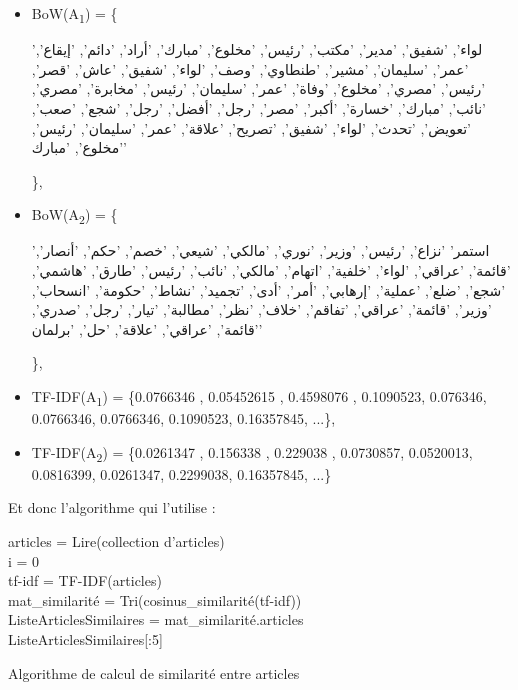     \begin{itemize}[label={}, leftmargin=0cm]
        \item BoW(A\textsubscript{1}) = \{\begin{arab}'لواء', 'شفيق', 'مدير', 'مكتب', 'رئيس', 'مخلوع', 'مبارك', 'أراد', 'دائم', 'إيقاع', 'عمر', 'سليمان', 'مشير', 'طنطاوي', 'وصف', 'لواء', 'شفيق', 'عاش', 'قصر', 'رئيس', 'مصري', 'مخلوع', 'وفاة', 'عمر', 'سليمان', 'رئيس', 'مخابرة', 'مصري', 'نائب', 'مبارك', 'خسارة', 'أكبر', 'مصر', 'رجل', 'أفضل', 'رجل', 'شجع', 'صعب', 'تعويض', 'تحدث', 'لواء', 'شفيق', 'تصريح', 'علاقة', 'عمر', 'سليمان', 'رئيس', 'مخلوع', 'مبارك'\end{arab}\},

        \item BoW(A\textsubscript{2}) = \{\begin{arab}'استمر' 'نزاع', 'رئيس', 'وزير', 'نوري', 'مالكي', 'شيعي', 'خصم', 'حكم', 'أنصار', 'قائمة', 'عراقي', 'لواء', 'خلفية', 'اتهام', 'مالكي', 'نائب', 'رئيس', 'طارق', 'هاشمي', 'شجع', 'ضلع', 'عملية', 'إرهابي', 'أمر', 'أدى', 'تجميد', 'نشاط', 'حكومة', 'انسحاب', 'وزير', 'قائمة', 'عراقي', 'تفاقم', 'خلاف', 'نظر', 'مطالبة', 'تيار', 'رجل', 'صدري', 'قائمة', 'عراقي', 'علاقة', 'حل', 'برلمان'\end{arab}\},

        \item TF-IDF(A\textsubscript{1}) = \{0.0766346 , 0.05452615 , 0.4598076 , 0.1090523,  0.076346, 0.0766346, 0.0766346, 0.1090523, 0.16357845, ...\},

        \item TF-IDF(A\textsubscript{2}) = \{0.0261347 , 0.156338 , 0.229038 , 0.0730857,  0.0520013, 0.0816399, 0.0261347, 0.2299038, 0.16357845, ...\}
    \end{itemize}

    Et donc l'algorithme qui l'utilise :\\
    \begin{algorithm2e}[H]
        \SetAlgoLined
        articles = Lire(collection d'articles)\\
        i = 0\\
        tf-idf = TF-IDF(articles)\\
        mat\_similarité = Tri(cosinus\_similarité(tf-idf))\\
        ListeArticlesSimilaires = mat\_similarité.articles\\
        \Return ListeArticlesSimilaires[:5]
        \caption{Algorithme de calcul de similarité entre articles}
    \end{algorithm2e}

